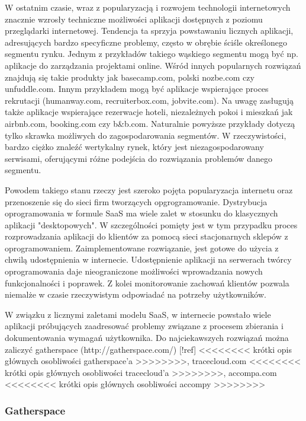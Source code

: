       W ostatnim czasie, wraz z popularyzacją i rozwojem technologii internetowych znacznie wzrosły techniczne możliwości aplikacji dostępnych z poziomu przeglądarki internetowej. Tendencja ta sprzyja powstawaniu licznych aplikacji, adresujących bardzo specyficzne problemy, często w obrębie ściśle określonego segmentu rynku. Jednym z przykładów takiego wąskiego segmentu mogą być np. aplikacje do zarządzania projektami online. Wśród innych popularnych rozwiązań znajdują się takie produkty jak basecamp.com, polski nozbe.com czy unfuddle.com. Innym przykładem mogą być aplikacje wspierające proces rekrutacji (humanway.com, recruiterbox.com, jobvite.com). Na uwagę zasługują także aplikacje wspierające rezerwacje hoteli, niezależnych pokoi i mieszkań jak airbnb.com, booking.com czy b\&b.com. Naturalnie powyższe przykłady dotyczą tylko skrawka możliwych do zagospodarowania segmentów. W rzeczywistości, bardzo ciężko znaleźć wertykalny rynek, który jest niezagospodarowany serwisami, oferującymi różne podejścia do rozwiązania problemów danego segmentu. 

      Powodem takiego stanu rzeczy jest szeroko pojęta popularyzacja internetu oraz przenoszenie się do sieci firm tworzących opgrogramowanie. Dystrybucja oprogramowania w formule SaaS ma wiele zalet w stosunku do klasycznych aplikacji "desktopowych". W szczególności pomięty jest w tym przypadku proces rozprowadzania aplikacji do klientów za pomocą sieci stacjonarnych sklepów z oprogramowaniem. Zaimplementowane rozwiązanie, jest gotowe do użycia z chwilą udostępnienia w internecie. Udostępnienie aplikacji na serwerach twórcy oprogramowania daje nieograniczone możliwości wprowadzania nowych funkcjonalności i poprawek. Z kolei monitorowanie zachowań klientów pozwala niemalże w czasie rzeczywistym odpowiadać na potrzeby użytkowników. 

      W związku z licznymi zaletami modelu SaaS, w internecie powstało wiele aplikacji próbujących zaadresować problemy związane z procesem zbierania i dokumentowania wymagań użytkownika. Do najciekawszych rozwiązań można zaliczyć gatherspace (http://gatherspace.com/) [!ref] <<<<<<<< krótki opis głównych osobliwości gatherspace'a >>>>>>>>, tracecloud.com <<<<<<<< krótki opis głównych osobliwości tracecloud'a >>>>>>>>, accompa.com <<<<<<<< krótki opis głównych osobliwości accompy >>>>>>>> 

      \subsubsection{Gatherspace}
